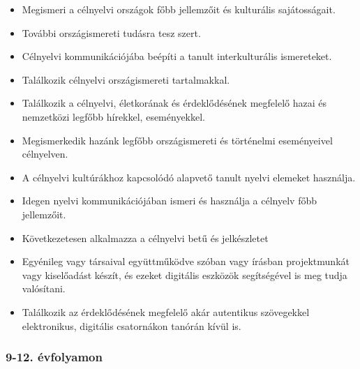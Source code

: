 \begin{itemize}
\item
  Megismeri a célnyelvi országok főbb jellemzőit és kulturális
  sajátosságait.
\item
  További országismereti tudásra tesz szert.
\item
  Célnyelvi kommunikációjába beépíti a tanult interkulturális
  ismereteket.
\item
  Találkozik célnyelvi országismereti tartalmakkal.
\item
  Találkozik a célnyelvi, életkorának és érdeklődésének megfelelő hazai
  és nemzetközi legfőbb hírekkel, eseményekkel.
\item
  Megismerkedik hazánk legfőbb országismereti és történelmi eseményeivel
  célnyelven.
\item
  A célnyelvi kultúrákhoz kapcsolódó alapvető tanult nyelvi elemeket
  használja.
\item
  Idegen nyelvi kommunikációjában ismeri és használja a célnyelv főbb
  jellemzőit.
\item
  Következetesen alkalmazza a célnyelvi betű és jelkészletet
\item
  Egyénileg vagy társaival együttműködve szóban vagy írásban
  projektmunkát vagy kiselőadást készít, és ezeket digitális eszközök
  segítségével is meg tudja valósítani.
\item
  Találkozik az érdeklődésének megfelelő akár autentikus szövegekkel
  elektronikus, digitális csatornákon tanórán kívül is.
\end{itemize}

\hypertarget{evfolyamon-10}{%
\subsubsection{9-12. évfolyamon}\label{evfolyamon-10}}

